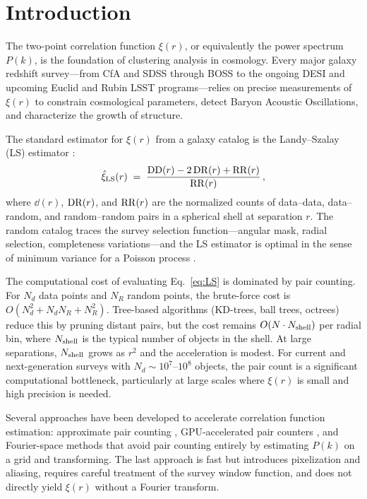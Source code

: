 \section{Introduction}
\label{sec:intro}

The two-point correlation function $\xi(r)$, or equivalently the power spectrum $P(k)$, is the foundation of clustering analysis in cosmology.  Every major galaxy redshift survey---from CfA and SDSS through BOSS to the ongoing DESI and upcoming Euclid and Rubin LSST programs---relies on precise measurements of $\xi(r)$ to constrain cosmological parameters, detect Baryon Acoustic Oscillations, and characterize the growth of structure.

The standard estimator for $\xi(r)$ from a galaxy catalog is the Landy--Szalay (LS) estimator \citep{Landy1993}:
\begin{equation}
  \hat{\xi}_{\mathrm{LS}}(r) \;=\; \frac{\mathrm{DD}(r) - 2\,\mathrm{DR}(r) + \mathrm{RR}(r)}{\mathrm{RR}(r)}\,,
  \label{eq:LS}
\end{equation}
where $\dd(r)$, $\mathrm{DR}(r)$, and $\mathrm{RR}(r)$ are the normalized counts of data--data, data--random, and random--random pairs in a spherical shell at separation $r$.  The random catalog traces the survey selection function---angular mask, radial selection, completeness variations---and the LS estimator is optimal in the sense of minimum variance for a Poisson process \citep{Landy1993}.

The computational cost of evaluating Eq.~\eqref{eq:LS} is dominated by pair counting.  For $N_d$ data points and $N_R$ random points, the brute-force cost is $O(N_d^2 + N_d N_R + N_R^2)$.  Tree-based algorithms (KD-trees, ball trees, octrees) reduce this by pruning distant pairs, but the cost remains $O(N \cdot N_{\rm shell})$ per radial bin, where $N_{\rm shell}$ is the typical number of objects in the shell.  At large separations, $N_{\rm shell}$ grows as $r^2$ and the acceleration is modest.  For current and next-generation surveys with $N_d \sim 10^7$--$10^8$ objects, the pair count is a significant computational bottleneck, particularly at large scales where $\xi(r)$ is small and high precision is needed.

Several approaches have been developed to accelerate correlation function estimation: approximate pair counting \citep{Szapudi1998}, GPU-accelerated pair counters \citep{Sinha2020}, and Fourier-space methods that avoid pair counting entirely by estimating $P(k)$ on a grid and transforming.  The last approach is fast but introduces pixelization and aliasing, requires careful treatment of the survey window function, and does not directly yield $\xi(r)$ without a Fourier transform.


